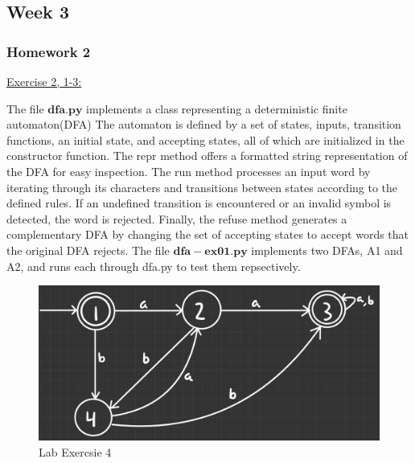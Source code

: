 \documentclass{article}
\theoremstyle{theorem}
\theoremstyle{definition}
\theoremstyle{remark}
\begin{document}
\subsection{Week 3}


\subsubsection*{Homework 2}

\underline{Exercise 2, 1-3:}

The file $\mathbf{dfa.py}$ implements a class representing a deterministic finite automaton(DFA) The automaton is defined by a set of states, inputs, transition functions, an initial state, and accepting states, all of which are initialized in the constructor function. The repr method offers a formatted string representation of the DFA for easy inspection. The run method processes an input word by iterating through its characters and transitions between states according to the defined rules. If an undefined transition is encountered or an invalid symbol is detected, the word is rejected. Finally, the refuse method generates a complementary DFA by changing the set of accepting states to accept words that the original DFA rejects.
\newline
The file $\mathbf{dfa-ex01.py}$ implements two DFAs, A1 and A2, and runs each through dfa.py to test them repsectively.




\begin{figure}
\begin{center}
\includegraphics[scale=0.2]{attachments/LabExercise4.jpg}
\end{center}
\caption{Lab Exercsie 4}
\end{figure}
\end{document}
